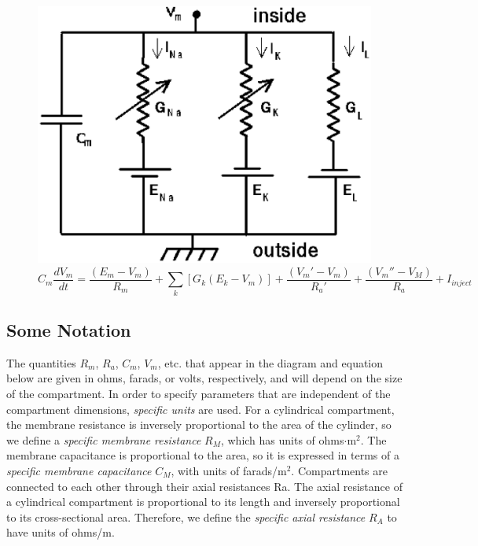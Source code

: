 \documentclass[12pt]{article}
\begin{document}
\begin{figure}[h]
  \centering
 \includegraphics[scale=0.5]{figures/HHcompt.eps}
  \label{fig:dendrite}
  \begin{displaymath}
		C_m \frac{dV_m}{dt} = \frac{(E_m-V_m)}{R_m}+\sum_k [G_k(E_k-V_m)]+\frac{(V_m'-V_m)}{R_a'} + \frac{(V_m''-V_M)}{R_a} +I_{inject}
\label{eq:figeq1}		
\end{displaymath}
\end{figure}

\subsection*{Some Notation}

The quantities $R_m$, $R_a$, $C_m$, $V_m$, etc. that appear in the diagram and equation below are given in ohms, farads, or volts, respectively, and will depend on the size of the compartment. In order to specify parameters that are independent of the compartment dimensions, {\it specific units} are used. For a cylindrical compartment, the membrane resistance is inversely proportional to the area of the cylinder, so we define a {\it specific membrane resistance} $R_M$, which has units of ohms$\cdot$m$^2$. The membrane capacitance is proportional to the area, so it is expressed in terms of a {\it specific membrane capacitance} $C_M$, with units of farads/m$^2$. Compartments are connected to each other through their axial resistances Ra. The axial resistance of a cylindrical compartment is proportional to its length and inversely proportional to its cross-sectional area. Therefore, we define the {\it specific axial resistance} $R_A$ to have units of ohms/m.
\end{document}
